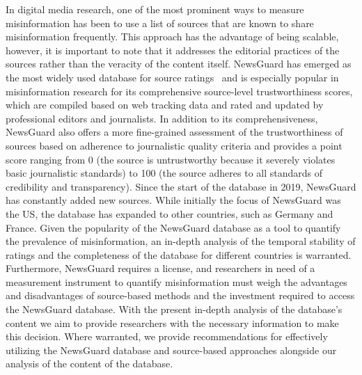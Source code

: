 \documentclass[12pt,twoside]{article}
\begin{document}
In digital media research, one of the most prominent ways to measure misinformation has been to use a list of sources that are known to share misinformation frequently.
This approach has the advantage of being scalable, however, it is important to note that it addresses the editorial practices of the sources rather than the veracity of the content itself.
NewsGuard has emerged as the most widely used database for source ratings~\citep{aslettNewsCredibilityLabels2022a, guessExposureUntrustworthyWebsites2020a, guessCrackingOpenNews2021, pratelliSwingingStatesDoes2023, robertsonUsersChooseEngage2023a} and is especially popular in misinformation research for its comprehensive source-level trustworthiness scores, which are compiled based on web tracking data and rated and updated by professional editors and journalists.
In addition to its comprehensiveness, NewsGuard also offers a more fine-grained assessment of the trustworthiness of sources based on adherence to journalistic quality criteria and provides a point score ranging from 0 (the source is untrustworthy because it severely violates basic journalistic standards) to 100 (the source adheres to all standards of credibility and transparency).
Since the start of the database in 2019, NewsGuard has constantly added new sources.
While initially the focus of NewsGuard was the US, the database has expanded to other countries, such as Germany and France. 
Given the popularity of the NewsGuard database as a tool to quantify the prevalence of misinformation, an in-depth analysis of the temporal stability of ratings and the completeness of the database for different countries is warranted.
Furthermore, NewsGuard requires a license, and researchers in need of a measurement instrument to quantify misinformation must weigh the advantages and disadvantages of source-based methods and the investment required to access the NewsGuard database. 
With the present in-depth analysis of the database's content we aim to provide researchers with the necessary information to make this decision.
Where warranted, we provide recommendations for effectively utilizing the NewsGuard database and source-based approaches alongside our analysis of the content of the database.
\end{document}
